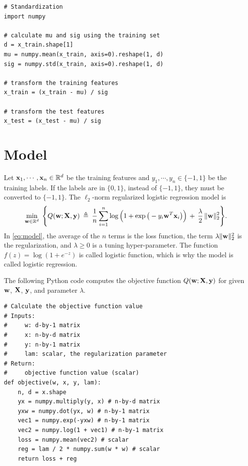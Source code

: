 \documentclass[11pt]{article}
\numberwithin{equation}{section}
\def\w{{\bf w}}
\def\X{{\bf X}}
\def\x{{\bf x}}
\def\y{{\bf y}}
\def\RB{{\mathbb R}}
\begin{document}
\vspace{3mm}
\begin{lstlisting}
# Standardization
import numpy

# calculate mu and sig using the training set
d = x_train.shape[1]
mu = numpy.mean(x_train, axis=0).reshape(1, d)
sig = numpy.std(x_train, axis=0).reshape(1, d)

# transform the training features
x_train = (x_train - mu) / sig

# transform the test features
x_test = (x_test - mu) / sig
\end{lstlisting}
\vspace{3mm}




\section{Model}

Let $\x_1, \cdots , \x_n \in \RB^d$ be the training features and $y_1 , \cdots , y_n \in \{-1, 1\}$ be the training labels.
If the labels are in $\{0, 1\}$, instead of $\{-1, 1\}$, they must be converted to $\{-1, 1\}$.
The $\ell_2$-norm regularized logistic regression model is
\begin{equation} \label{eq:model}
\min_{\w \in \RB^d} \;
\Bigg\{  
Q (\w ; \X , \y ) \: \triangleq \:
\frac{1}{n}  \sum_{i=1}^n \log \Big( 1 + \exp \big( - y_i \w^T \x_i \big) \Big) 
\, + \, \frac{\lambda}{2} \, \| \w \|_2^2 \Bigg\} .
\end{equation}
In \eqref{eq:model}, the average of the $n$ terms is the loss function, 
the term  $ \lambda \| \w \|_2^2$ is the regularization,
and $\lambda \geq 0$ is a tuning hyper-parameter.
The function $f(z) = \log (1 + e^{-z})$ is called logistic function, which is why the model is called logistic regression.


The following Python code computes the objective function $Q (\w ; \X , \y )$ for given $\w$, $\X$, $\y$, and parameter $\lambda$.


\vspace{3mm}
\begin{lstlisting}
# Calculate the objective function value
# Inputs:
#     w: d-by-1 matrix
#     x: n-by-d matrix
#     y: n-by-1 matrix
#     lam: scalar, the regularization parameter
# Return:
#     objective function value (scalar)
def objective(w, x, y, lam):
	n, d = x.shape
	yx = numpy.multiply(y, x) # n-by-d matrix
	yxw = numpy.dot(yx, w) # n-by-1 matrix
	vec1 = numpy.exp(-yxw) # n-by-1 matrix
	vec2 = numpy.log(1 + vec1) # n-by-1 matrix
	loss = numpy.mean(vec2) # scalar
	reg = lam / 2 * numpy.sum(w * w) # scalar
	return loss + reg
\end{lstlisting}
\vspace{3mm}
\end{document}
